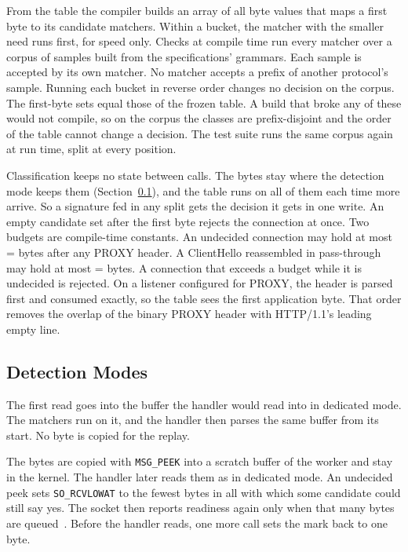 From the table the compiler builds an array of all byte values that maps a first byte to its
candidate matchers. Within a bucket, the matcher with the smaller need runs first, for speed only.
Checks at compile time run every matcher over a corpus of samples built from the
specifications' grammars. Each sample is accepted by its own matcher. No matcher accepts a prefix
of another protocol's sample. Running each bucket in reverse order changes no decision on the
corpus. The first-byte sets equal those of the frozen table. A build that broke any of these
would not compile, so on the corpus the classes are prefix-disjoint and the order of the table
cannot change a decision. The test suite runs the same corpus again at run time, split at every
position.

Classification keeps no state between calls. The bytes stay where the detection mode keeps them
(Section~\ref{sec:modes}), and the table runs on all of them each time more arrive. So a signature
fed in any split gets the decision it gets in one write. An empty candidate set after the first
byte rejects the connection at once. Two budgets are compile-time constants. An undecided
connection may hold at most \Bdec{} = \BDec{} bytes after any PROXY header. A ClientHello
reassembled in pass-through may hold at most \Bch{} = \BCh{} bytes. A connection that exceeds a budget while it
is undecided is rejected. On a listener configured for PROXY, the header is parsed first and
consumed exactly, so the table sees the first application byte. That order removes the overlap of
the binary PROXY header with HTTP/1.1's leading empty line.

\subsection{Detection Modes}\label{sec:modes}

 The first read goes into the buffer the handler would read into in dedicated mode.
The matchers run on it, and the handler then parses the same buffer from its start. No byte is
copied for the replay.

 The bytes are copied with \texttt{MSG\_PEEK} into a scratch buffer of the worker and
stay in the kernel. The handler later reads them as in dedicated mode. An undecided peek sets
\texttt{SO\_RCVLOWAT} to the fewest bytes in all with which some candidate could still say yes.
The socket then reports readiness again only when that many bytes are queued~\cite{man2026socket}.
Before the handler reads, one more call sets the mark back to one byte.

